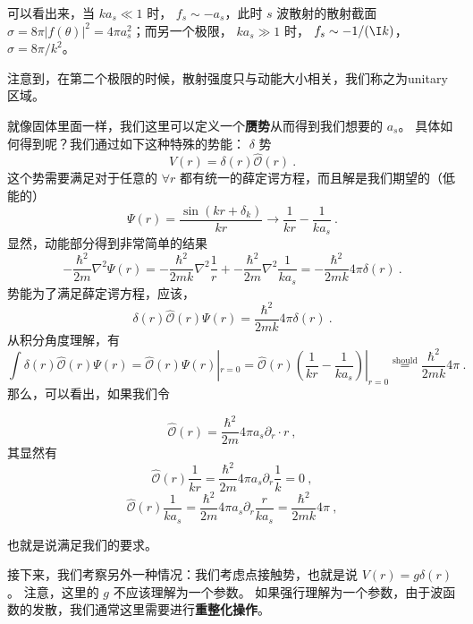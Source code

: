 可以看出来，当 $ka_s\ll1$ 时， $f_s\sim -a_s$，此时 $s$ 波散射的散射截面 $\sigma = 8\pi |f(\theta)|^2 = 4\pi a_s^2$；而另一个极限， $ka_s\gg1$ 时， $f_s\sim- 1/(\I k)$， $\sigma = 8\pi/k^2$。

注意到，在第二个极限的时候，散射强度只与动能大小相关，我们称之为unitary区域。

就像固体里面一样，我们这里可以定义一个\textbf{赝势}从而得到我们想要的 $a_s$。 具体如何得到呢？我们通过如下这种特殊的势能： $\delta$ 势
\begin{equation}
V(r) = \delta(r)\hat{\mathcal{O}}(r)~.
\end{equation}
这个势需要满足对于任意的 $\forall r$ 都有统一的薛定谔方程，而且解是我们期望的（低能的）
\begin{equation}
\Psi(r) = \frac{\sin(kr+\delta_k)}{kr}\to \frac{1}{kr} - \frac{1}{ka_s}~.
\end{equation}
显然，动能部分得到非常简单的结果
\begin{equation}
-\frac{\hbar^2}{2m}\nabla^2\Psi(r) = -\frac{\hbar^2}{2mk}\nabla^2 \frac{1}{r} + -\frac{\hbar^2}{2m}\nabla^2\frac{1}{ka_s} = -\frac{\hbar^2}{2mk}4\pi\delta(r)~.
\end{equation}
势能为了满足薛定谔方程，应该，
\begin{equation}
\delta(r)\hat{\mathcal{O}}(r)\Psi(r) = \frac{\hbar^2}{2mk}4\pi\delta(r)~.
\end{equation}
从积分角度理解，有
\begin{equation}
\int\delta(r)\hat{\mathcal{O}}(r)\Psi(r) = \hat{\mathcal{O}}(r)\Psi(r)|_{r=0} =  \hat{\mathcal{O}}(r)\left(\frac{1}{kr} - \frac{1}{ka_s}\right)|_{r=0} \overset{\text{should}}{=} \frac{\hbar^2}{2mk}4\pi~.
\end{equation}
那么，可以看出，如果我们令

\begin{equation}
\hat{\mathcal{O}}(r) = \frac{\hbar^2}{2m}4\pi a_s \partial_r\cdot r~,
\end{equation}
其显然有
\begin{equation}
\hat{\mathcal{O}}(r)\frac{1}{kr} = \frac{\hbar^2}{2m}4\pi a_s \partial_r \frac{1}{k} = 0~,
\end{equation}
\begin{equation}
\hat{\mathcal{O}}(r)\frac{1}{ka_s} = \frac{\hbar^2}{2m}4\pi a_s \partial_r \frac{r}{ka_s} = \frac{\hbar^2}{2mk}4\pi~,
\end{equation}

也就是说满足我们的要求。

接下来，我们考察另外一种情况：我们考虑点接触势，也就是说 $V(r) = g\delta(r)$。 注意，这里的 $g$ 不应该理解为一个参数。 如果强行理解为一个参数，由于波函数的发散，我们通常这里需要进行\textbf{重整化操作}。

